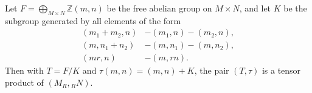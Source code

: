 Let $F = \bigoplus_{M \times N} \mathbb{Z}(m, n)$ be the free abelian group on $M \times N$, and let $K$ be the subgroup generated by all elements of the form
\begin{align*}
(m_1 + m_2, n) &- (m_1, n) - (m_2, n),\\
(m, n_1 + n_2) &- (m, n_1) - (m, n_2),\\
(mr, n) &- (m, rn).
\end{align*}
Then with $T = F/K$ and $\tau(m, n) = (m, n) + K$, the pair $(T, \tau)$ is a tensor product of $(M_R, {}_R N)$.
